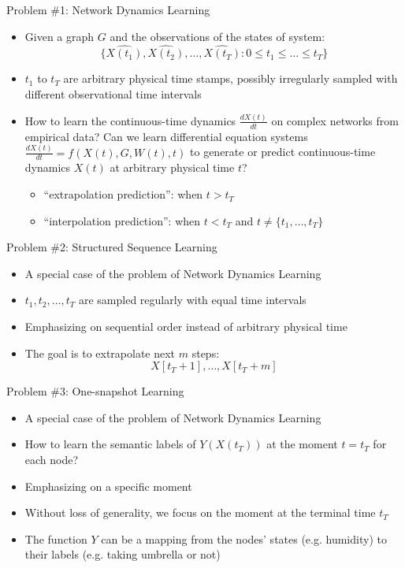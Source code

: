 \documentclass{beamer}
\begin{document}
\begin{frame}{Problem \#1: Network Dynamics Learning}
\begin{itemize}
\item Given a graph $G$ and the observations of the states of system:\[
\{\hat{X(t_1)},\hat{X(t_2)},\dots,\hat{X(t_T)}:0\leqslant t_1\leqslant\dots\leqslant t_T\}
\]
\item $t_1$ to $t_T$ are arbitrary physical time stamps, possibly irregularly sampled with different observational time intervals
\item How to learn the continuous-time dynamics $\frac{dX(t)}{dt}$ on complex networks from empirical data? Can we learn differential equation systems $\frac{dX(t)}{dt}=f(X(t),G,W(t),t)$ to generate or predict continuous-time dynamics $X(t)$ at arbitrary physical time $t$?
\begin{itemize}
\item ``extrapolation prediction'': when $t>t_T$
\item ``interpolation prediction'': when $t<t_T$ and $t\ne\{t_1,\dots,t_T\}$ 
\end{itemize}
\end{itemize}
\end{frame}

\begin{frame}{Problem \#2: Structured Sequence Learning}
\begin{itemize}
\item A special case of the problem of Network Dynamics Learning
\item $t_1,t_2,\dots,t_T$ are sampled regularly with equal time intervals
\item Emphasizing on sequential order instead of arbitrary physical time
\item The goal is to extrapolate next $m$ steps:\[
X[t_T+1],\dots,X[t_T+m]
\]
\end{itemize}
\end{frame}

\begin{frame}{Problem \#3: One-snapshot Learning}
\begin{itemize}
\item A special case of the problem of Network Dynamics Learning
\item How to learn the semantic labels of $Y(X(t_T))$ at the moment $t=t_T$ for each node?
\item Emphasizing on a specific moment
\item Without loss of generality, we focus on the moment at the terminal time $t_T$
\item The function $Y$ can be a mapping from the nodes' states (e.g. humidity) to their labels (e.g. taking umbrella or not)
\end{itemize}
\end{frame}
\end{document}

